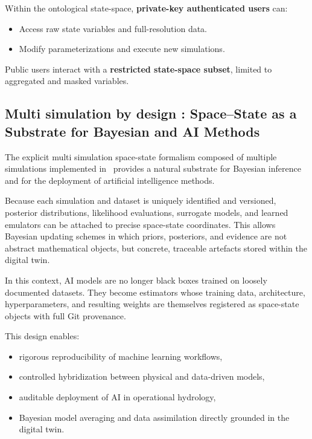 Within the ontological state-space, \textbf{private-key authenticated users} can:
\begin{itemize}
    \item Access raw state variables and full-resolution data.
    \item Modify parameterizations and execute new simulations.
\end{itemize}
Public users interact with a \textbf{restricted state-space subset}, limited to aggregated and  masked variables.




\subsection{Multi simulation by design : Space--State as a Substrate for Bayesian and AI Methods}

The explicit multi simulation space-state formalism composed of multiple simulations implemented in \hydrot\ provides a natural substrate for Bayesian inference and for the deployment of artificial intelligence methods.

Because each simulation and dataset is uniquely identified and versioned, posterior distributions, likelihood evaluations, surrogate models, and learned emulators can be attached to precise space-state coordinates. This allows Bayesian updating schemes in which priors, posteriors, and evidence are not abstract mathematical objects, but concrete, traceable artefacts stored within the digital twin.

In this context, AI models are no longer black boxes trained on loosely documented datasets. They become estimators whose training data, architecture, hyperparameters, and resulting weights are themselves registered as space-state objects with full Git provenance.

This design enables:
\begin{itemize}
\item rigorous reproducibility of machine learning workflows,
\item controlled hybridization between physical and data-driven models,
\item auditable deployment of AI in operational hydrology,
\item Bayesian model averaging and data assimilation directly grounded in the digital twin.
\end{itemize}

